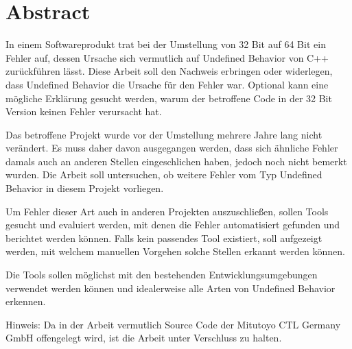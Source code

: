 \chapter*{Abstract}
\label{ch:abstract}
In einem Softwareprodukt trat bei der Umstellung von 32 Bit auf 64 Bit ein Fehler auf,
dessen Ursache sich vermutlich auf Undefined Behavior von C++ zurückführen lässt. Diese Arbeit soll den Nachweis erbringen oder widerlegen,
dass Undefined Behavior die Ursache für den Fehler war. Optional kann eine mögliche Erklärung gesucht werden,
warum der betroffene Code in der 32 Bit Version keinen Fehler verursacht hat.

Das betroffene Projekt wurde vor der Umstellung mehrere Jahre lang nicht verändert. Es muss daher davon ausgegangen werden,
dass sich ähnliche Fehler damals auch an anderen Stellen eingeschlichen haben, jedoch noch nicht  bemerkt wurden.
Die Arbeit soll untersuchen, ob weitere Fehler vom Typ Undefined Behavior in diesem Projekt vorliegen.

Um Fehler dieser Art auch in anderen Projekten auszuschließen, sollen Tools gesucht und evaluiert werden,
mit denen die Fehler automatisiert gefunden und berichtet werden können. Falls kein passendes Tool existiert, soll aufgezeigt werden,
mit welchem manuellen Vorgehen solche Stellen erkannt werden können.

Die Tools sollen möglichst mit den bestehenden Entwicklungsumgebungen verwendet werden können und idealerweise alle Arten von
Undefined Behavior erkennen.

Hinweis: Da in der Arbeit vermutlich Source Code der Mitutoyo CTL Germany GmbH offengelegt wird, ist die Arbeit unter Verschluss zu halten.
